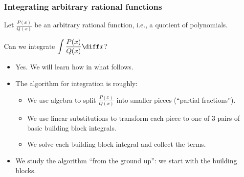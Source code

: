 \begin{frame}
\frametitle{Integrating arbitrary rational functions}
Let $\frac{P(x)}{Q(x)}$ be an arbitrary rational function, i.e., a quotient of polynomials.
\begin{question}
Can we integrate $\displaystyle\int \frac{P(x)}{Q(x)}\diff x$?
\end{question}
\begin{itemize}
\item<2-> Yes. We will learn how in what follows.
\item<3-> The algorithm for integration is roughly:
\begin{itemize}
\item<4-> We use algebra to split $\frac{P(x)}{Q(x)}$ into smaller pieces (``partial fractions''). 
\item<5-> We use linear substitutions to transform each piece to one of $3$ pairs of basic building block integrals. 
\item<6-> We solve each building block integral and collect the terms.
\end{itemize}
\item<7-> We study the algorithm ``from the ground up'': we start with the building blocks.
\end{itemize}
\end{frame}

